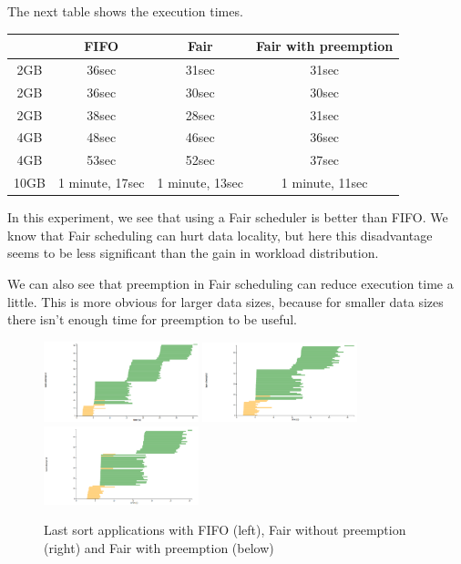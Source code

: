 \documentclass{article}
\begin{document}
The next table shows the execution times.

\begin{center}
\begin{tabular}{|c|c|c|c|}
\hline
\ & FIFO & Fair & Fair with preemption \\
\hline
2GB & 36sec & 31sec & 31sec \\
\hline
2GB & 36sec & 30sec & 30sec \\
\hline
2GB & 38sec & 28sec & 31sec \\
\hline
4GB & 48sec & 46sec & 36sec \\
\hline
4GB & 53sec & 52sec & 37sec \\
\hline
10GB & 1 minute, 17sec & 1 minute, 13sec & 1 minute, 11sec \\
\hline
\end{tabular}
\end{center}


In this experiment, we see that using a Fair scheduler is better than FIFO. We know that Fair scheduling can hurt data locality, but here this disadvantage seems to be less significant than the gain in workload distribution.

We can also see that preemption in Fair scheduling can reduce execution time a little. This is more obvious for larger data sizes, because for smaller data sizes there isn't enough time for preemption to be useful.



\begin{figure}%
  \centering
  \includegraphics[width=0.4\textwidth]{fifo2.png}
  \includegraphics[width=0.4\textwidth]{fair2.png}
  \includegraphics[width=0.4\textwidth]{fair_preemp2.png}
  \caption{Last sort applications with FIFO (left), Fair without preemption (right) and Fair with preemption (below)}
  \label{fair}
\end{figure}
\end{document}
